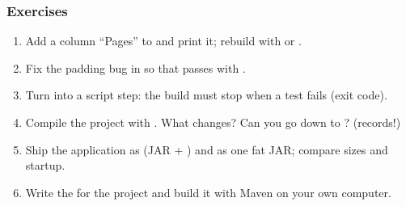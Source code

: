 \documentclass[aspectratio=169,10pt,compress]{beamer}
\begin{document}
\begin{frame}[t,fragile] \frametitle{Exercises}
  \begin{enumerate}\small
    \item Add a column ``Pages'' to  and print it; rebuild with  or .
    \item Fix the padding bug in  so that  passes with .
    \item Turn  into a script step: the build must stop when a test fails (exit code).
    \item Compile the project with . What changes? Can you go down to ? (records!)
    \item Ship the application as  (JAR + ) and as one fat JAR; compare sizes and startup.
    \item Write the  for the project and build it with Maven on your own computer.
  \end{enumerate}
\end{frame}




\begin{frame}[t,fragile]
	\begin{center}
		\vspace{4cm}
	\end{center}
\end{frame}
\end{document}
